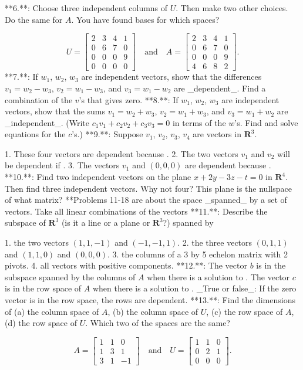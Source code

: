 

**6.**: Choose three independent columns of \(U\). Then make two other choices. Do the same for \(A\). You have found bases for which spaces?

\[U=\begin{bmatrix}2&3&4&1\\ 0&6&7&0\\ 0&0&0&9\\ 0&0&0&0\end{bmatrix}\quad\text{and}\quad A=\begin{bmatrix}2&3&4&1\\ 0&6&7&0\\ 0&0&0&9\\ 4&6&8&2\end{bmatrix}.\]
**7.**: If \(w_{1}\), \(w_{2}\), \(w_{3}\) are independent vectors, show that the differences \(v_{1}=w_{2}-w_{3}\), \(v_{2}=w_{1}-w_{3}\), and \(v_{3}=w_{1}-w_{2}\) are _dependent_. Find a combination of the \(v\)'s that gives zero.
**8.**: If \(w_{1}\), \(w_{2}\), \(w_{3}\) are independent vectors, show that the sums \(v_{1}=w_{2}+w_{3}\), \(v_{2}=w_{1}+w_{3}\), and \(v_{3}=w_{1}+w_{2}\) are _independent_. (Write \(c_{1}v_{1}+c_{2}v_{2}+c_{3}v_{3}=0\) in terms of the \(w\)'s. Find and solve equations for the \(c\)'s.)
**9.**: Suppose \(v_{1}\), \(v_{2}\), \(v_{3}\), \(v_{4}\) are vectors in \(\mathbf{R}^{3}\).

1. These four vectors are dependent because .
2. The two vectors \(v_{1}\) and \(v_{2}\) will be dependent if .
3. The vectors \(v_{1}\) and \((0,0,0)\) are dependent because .
**10.**: Find two independent vectors on the plane \(x+2y-3z-t=0\) in \(\mathbf{R}^{4}\). Then find three independent vectors. Why not four? This plane is the nullspace of what matrix?
**Problems 11-18 are about the space _spanned_ by a set of vectors. Take all linear combinations of the vectors
**11.**: Describe the subspace of \(\mathbf{R}^{3}\) (is it a line or a plane or \(\mathbf{R}^{3}\)?) spanned by

1. the two vectors \((1,1,-1)\) and \((-1,-1,1)\).
2. the three vectors \((0,1,1)\) and \((1,1,0)\) and \((0,0,0)\).
3. the columns of a 3 by 5 echelon matrix with 2 pivots.
4. all vectors with positive components.
**12.**: The vector \(b\) is in the subspace spanned by the columns of \(A\) when there is a solution to . The vector \(c\) is in the row space of \(A\) when there is a solution to . _True or false_: If the zero vector is in the row space, the rows are dependent.
**13.**: Find the dimensions of (a) the column space of \(A\), (b) the column space of \(U\), (c) the row space of \(A\), (d) the row space of \(U\). Which two of the spaces are the same?

\[A=\begin{bmatrix}1&1&0\\ 1&3&1\\ 3&1&-1\end{bmatrix}\quad\text{and}\quad U=\begin{bmatrix}1&1&0\\ 0&2&1\\ 0&0&0\end{bmatrix}.\]